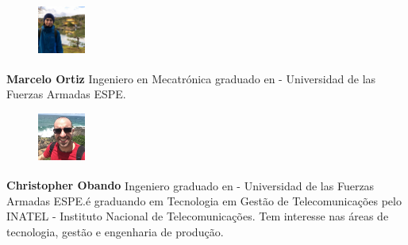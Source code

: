\begin{figure}
\includegraphics[trim= 0 2 0 0,clip,width=0.14\textwidth]{figuras/autor3.jpg}  
\end{figure}

   \textbf{Marcelo Ortiz\textsuperscript{\contAutor}} Ingeniero  en Mecatrónica graduado en - Universidad de las Fuerzas Armadas ESPE.\newline
   
\begin{figure}
\includegraphics[trim= 0 2 0 0,clip,width=0.14\textwidth]{figuras/autor1.jpg}  
\end{figure}

   \textbf{Christopher Obando\textsuperscript{\contAutor}} Ingeniero  graduado en - Universidad de las Fuerzas Armadas ESPE.é graduando em Tecnologia em Gestão de Telecomunicações pelo INATEL - Instituto Nacional de Telecomunicações. Tem interesse nas áreas de tecnologia, gestão e engenharia de produção.